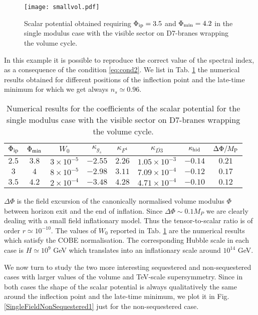 \documentclass[11pt,a4paper]{article}
\begin{document}
\begin{figure}[H]
\centering
\texttt{[image: smallvol.pdf]}
\caption{Scalar potential obtained requiring $\Phi_{\rm ip} = 3.5$ and $\Phi_{\rm min} = 4.2$ in the single modulus case with the visible sector on D7-branes wrapping the volume cycle.}
\label{smallvol}
\end{figure}

In this example it is possible to reproduce the correct value of the spectral index, as a consequence of the condition \eqref{eq:cond2}. We list in Tab. \ref{tab0} the numerical results obtained for different positions of the inflection point and the late-time minimum for which we get always $n_s \simeq 0.96$.
\begin{table}[H]
\begin{center}
\begin{tabular}{cccccccc}
\hline
$\Phi_{\rm ip}$ & $\Phi_{\rm min}$ & $W_0$ & $\kappa_{g_s}$ & $\kappa_{F^4}$ & $\kappa_{\overline{D3}}$ & $\kappa_{\rm hid}$ & $\Delta \Phi/M_{\rm P}$ \\
\hline
$2.5$ & $3.8$ & $3 \times 10^{-5}$ & $-2.55$ & $2.26$ & $1.05 \times 10^{-3}$ & $-0.14$  & $0.21$\\
\hline
$3$ & $4$ & $8 \times 10^{-5}$ & $-2.98$ & $3.11$  & $7.09 \times 10^{-4}$ & $-0.12$ & $0.17$ \\
\hline
$3.5$ & $4.2$ & $2 \times 10^{-4}$ & $-3.48$ & $4.28$ & $4.71 \times 10^{-4}$ & $-0.10$ & $0.12$ \\
\hline
\end{tabular}
\end{center}
\caption{Numerical results for the coefficients of the scalar potential for the single modulus case with the visible sector on D7-branes wrapping the volume cycle.}
\label{tab0}
\end{table}

$\Delta \Phi$ is the field excursion of the canonically normalised volume modulus $\Phi$ between horizon exit and the end of inflation. Since $\Delta \Phi\sim 0.1 M_P$ we are clearly dealing with a small field inflationary model. Thus the tensor-to-scalar ratio is of order $r \simeq 10^{-10}$. The values of $W_0$ reported in Tab. \ref{tab0} are the numerical results which satisfy the COBE normalisation. The corresponding Hubble scale in each case is $H \simeq 10^9$ GeV which translates into an inflationary scale around $10^{14}$ GeV. 

We now turn to study the two more interesting sequestered and non-sequestered cases with larger values of the volume and TeV-scale supersymmetry. 
Since in both cases the shape of the scalar potential is always qualitatively the same around the inflection point and the late-time minimum, we plot it in Fig. \ref{SingleFieldNonSequestered1} just for the non-sequestered case. 
\end{document}
